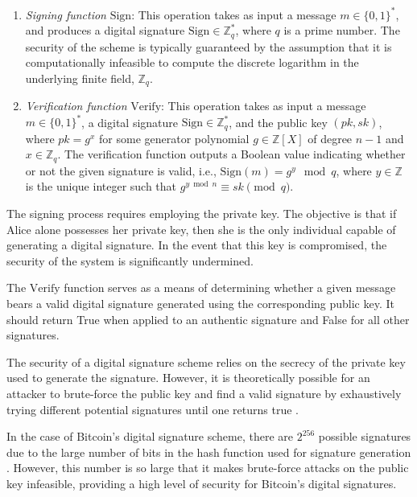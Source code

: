 \begin{enumerate}
    \item \emph{Signing function} $\text{Sign}$: This operation takes as input a message $m \in \{0, 1\}^*$, and produces a digital signature
    $\text{Sign} \in \mathbb{Z}_q^*$, where $q$ is a prime number. The security of the scheme is typically guaranteed by the assumption that
    it is computationally infeasible to compute the discrete logarithm in the underlying finite field, $\mathbb{Z}_q$.

    \item \emph{Verification function} $\text{Verify}$: This operation takes as input a message $m \in \{0, 1\}^*$, a digital signature
    $\text{Sign} \in \mathbb{Z}_q^*$, and the public key $(pk, sk)$, where $pk = g^x$ for some generator polynomial $g \in \mathbb{Z}[X]$
    of degree $n-1$ and $x \in \mathbb{Z}_q$. The verification function outputs a Boolean value indicating whether or not the given signature
    is valid, i.e., $\text{Sign}(m) = g^y \mod q$, where $y \in \mathbb{Z}$ is the unique integer such that $g^{y\bmod{n}} \equiv sk \pmod{q}$.

\end{enumerate}

The signing process requires employing the private key. The objective is that if Alice alone possesses her private key, then she is the only
individual capable of generating a digital signature. In the event that this key is compromised, the security of the system is significantly
undermined.

The $\text{Verify}$ function serves as a means of determining whether a given message bears a valid digital signature generated using the
corresponding public key. It should return True when applied to an authentic signature and False for all other signatures.

The security of a digital signature scheme relies on the secrecy of the private key used to generate the signature. However, it is
theoretically possible for an attacker to brute-force the public key and find a valid signature by exhaustively trying different potential
signatures until one returns true \cite{boneh2001short}.

In the case of Bitcoin's digital signature scheme, there are $2^{256}$ possible signatures due to the large number of bits in the hash function
used for signature generation \cite{dss}. However, this number is so large that it makes brute-force attacks on the public key infeasible,
providing a high level of security for Bitcoin's digital signatures.
